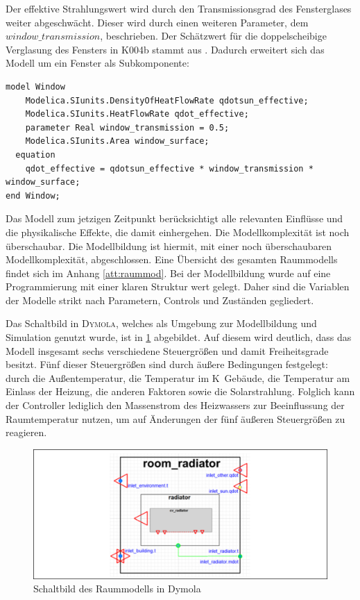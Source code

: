 Der effektive Strahlungswert wird durch den Transmissionsgrad des Fensterglases weiter abgeschwächt. Dieser wird durch einen weiteren Parameter, dem $window\_transmission$, beschrieben. Der Schätzwert für die doppelscheibige Verglasung des Fensters in K004b stammt aus \cite[S.~63]{ha13}. Dadurch erweitert sich das Modell um ein Fenster als Subkomponente:

\begin{lstlisting}[language=Modelica, caption={Fenster als Subkomponente des Raummodells},label=lst:raumdrei]
model Window
	Modelica.SIunits.DensityOfHeatFlowRate qdotsun_effective;
	Modelica.SIunits.HeatFlowRate qdot_effective;
	parameter Real window_transmission = 0.5;
	Modelica.SIunits.Area window_surface;
  equation
  	qdot_effective = qdotsun_effective * window_transmission * window_surface;
end Window;
\end{lstlisting}

Das Modell zum jetzigen Zeitpunkt berücksichtigt alle relevanten Einflüsse und die physikalische Effekte, die damit einhergehen. Die Modellkomplexität ist noch überschaubar. Die Modellbildung ist hiermit, mit einer noch überschaubaren Modellkomplexität, abgeschlossen. Eine Übersicht des gesamten Raummodells findet sich im Anhang \ref{att:raummod}. Bei der Modellbildung wurde auf eine Programmierung mit einer klaren Struktur wert gelegt. Daher sind die Variablen der Modelle strikt nach Parametern, Controls und Zuständen gegliedert.

Das Schaltbild in \textsc{Dymola}, welches als Umgebung zur Modellbildung und Simulation genutzt wurde, ist in \ref{fig:raumdym} abgebildet. Auf diesem wird deutlich, dass das Modell insgesamt sechs verschiedene Steuergrößen und damit Freiheitsgrade besitzt. Fünf dieser Steuergrößen sind durch äußere Bedingungen festgelegt: durch die Außentemperatur, die Temperatur im K~Gebäude, die Temperatur am Einlass der Heizung, die anderen Faktoren sowie die Solarstrahlung. Folglich kann der Controller lediglich den Massenstrom des Heizwassers zur Beeinflussung der Raumtemperatur nutzen, um auf Änderungen der fünf äußeren Steuergrößen zu reagieren. 

\begin{figure}
\centering
\includegraphics[width=\textwidth]{abbildungen/20160331_raumdym}
\caption{Schaltbild des Raummodells in Dymola}
\label{fig:raumdym}
\end{figure}

